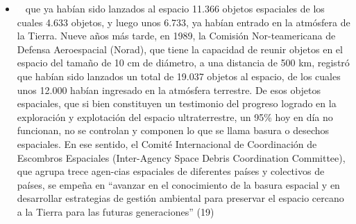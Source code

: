 \documentclass[12pt,letterpaper]{article}
\begin{document}
\pagestyle{fancy}
        \fancyhf{}
        \rhead{}
\begin{multicols}{2}
\begin {itemize}
    \item[\textcolor{white}{x}]que ya habían sido lanzados al espacio 11.366 objetos espaciales de los cuales 4.633 objetos, y luego unos 6.733, ya habían entrado en la atmósfera de la Tierra. Nueve años más tarde, en 1989, la Comisión Nor-teamericana de Defensa Aeroespacial (Norad), que tiene  la  capacidad  de  reunir  objetos  en  el  espacio  del tamaño de 10 cm de diámetro, a una distancia de 500 km, registró que habían sido lanzados un total de  19.037  objetos  al  espacio,  de  los  cuales  unos  12.000 habían ingresado en la atmósfera terrestre. De esos objetos espaciales, que si bien constituyen un testimonio del progreso logrado en la exploración y explotación del espacio ultraterrestre, un 95\% hoy en día no funcionan, no se controlan y componen lo que se llama basura o desechos espaciales. En ese sentido, el Comité Internacional de Coordinación de Escombros Espaciales (Inter-Agency Space Debris Coordination Committee), que agrupa trece agen-cias  espaciales  de  diferentes  países  y  colectivos  de  países,  se  empeña  en  “avanzar  en  el  conocimiento  de la basura espacial y en desarrollar estrategias de gestión ambiental para preservar el espacio cercano a la Tierra para las futuras generaciones” (19) 
  \end{itemize} 

\end{multicols}
\end{document}
